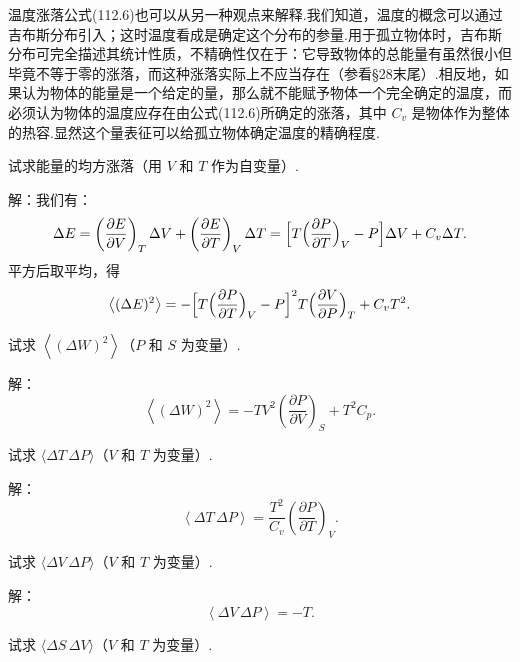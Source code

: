 温度涨落公式(112.6)也可以从另一种观点来解释.我们知道，温度的概念可以通过吉布斯分布引入；这时温度看成是确定这个分布的参量.用于孤立物体时，吉布斯分布可完全描述其统计性质，不精确性仅在于：它导致物体的总能量有虽然很小但毕竟不等于零的涨落，而这种涨落实际上不应当存在（参看§28末尾）.相反地，如果认为物体的能量是一个给定的量，那么就不能赋予物体一个完全确定的温度，而必须认为物体的温度应存在由公式(112.6)所确定的涨落，其中 $C_{v}$ 是物体作为整体的热容.显然这个量表征可以给孤立物体确定温度的精确程度.

\begin{xiti}

\quad 试求能量的均方涨落（用 $V$ 和 $T$ 作为自变量）.

解：我们有：
\begin{equation*}
  \Delta E=\left(\frac{\partial E}{\partial V}\right)_{T}\Delta V
  +\left(\frac{\partial E}{\partial T}\right)_{V}\Delta T
  =\Bigl[T\Bigl(\frac{\partial P}{\partial T}\Bigr)_{V}-P\Bigr]\Delta V
  +C_{v}\Delta T.
\end{equation*}
平方后取平均，得
\begin{equation*}
  \left\langle(\Delta E)^{2}\right\rangle
  =-\Bigl[T\Bigl(\frac{\partial P}{\partial T}\Bigr)_{V}-P\Bigr]^{2}
  T\Bigl(\frac{\partial V}{\partial P}\Bigr)_{T}+C_{v}T^{2}.
\end{equation*}

\quad 试求 $\left\langle(\Delta W)^{2}\right\rangle$（$P$ 和
$S$ 为变量）.

解：
\begin{equation*}
  \left\langle(\Delta W)^{2}\right\rangle
  =-TV^{2}\left(\frac{\partial P}{\partial V}\right)_{S}+T^{2}C_{p}.
\end{equation*}

\quad 试求 $\langle\Delta T\,\Delta P\rangle$（$V$ 和 $T$ 为变量）.

解：
\begin{equation*}
  \left\langle\Delta T\,\Delta P\right\rangle
  =\frac{T^{2}}{C_{v}}\left(\frac{\partial P}{\partial T}\right)_{V}.
\end{equation*}

\quad 试求 $\langle\Delta V\,\Delta P\rangle$（$V$ 和 $T$ 为变量）.

解：
\begin{equation*}
  \left\langle\Delta V\,\Delta P\right\rangle=-T.
\end{equation*}

\quad 试求 $\langle\Delta S\,\Delta V\rangle$（$V$ 和 $T$ 为变量）.


\end{xiti}
